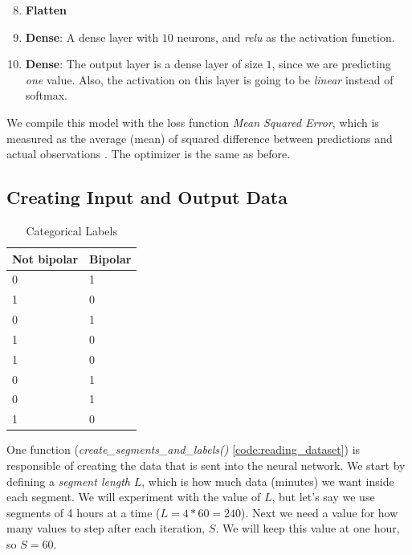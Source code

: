 \begin{enumerate}
      \setcounter{enumi}{7}
      \item \textbf{Flatten}
      \item \textbf{Dense}: A dense layer with $10$ neurons, and \textit{relu} as the activation function.
      \item \textbf{Dense}: The output layer is a dense layer of size $1$, since we are predicting \textit{one} value. 
            Also, the activation on this layer is going to be \textit{linear} instead of softmax.
\end{enumerate}

We compile this model with the loss function \textit{Mean Squared Error}, which is measured as the average (mean) 
of squared difference between predictions and actual observations \cite{loss_functions}. The optimizer is the same as before.

\subsection{Creating Input and Output Data}
\begin{table}
  \begin{center}
    \begin{tabular}{| l | l |}
      \hline
      \textbf{Not bipolar} & \textbf{Bipolar}  \\ \hline
      0                    &  1                \\ \hline
      1                    &  0                \\ \hline
      0                    &  1                \\ \hline
      1                    &  0                \\ \hline
      1                    &  0                \\ \hline
      0                    &  1                \\ \hline
      0                    &  1                \\ \hline
      1                    &  0                \\ \hline
    \end{tabular}
    \caption{Categorical Labels}
    \label{table:categorical_labels}
  \end{center}
\end{table}

One function (\textit{create\_segments\_and\_labels()} \ref{code:reading_dataset}) is responsible of creating the data that is sent into the neural network. 
We start by defining a \textit{segment length} $L$, which is how much data (minutes) we want inside each segment. We will experiment with the value of $L$, 
but let's say we use segments of 4 hours at a time ($L=4*60=240$). Next we need a value for how many values to step after each iteration, $S$. 
We will keep this value at one hour, so $S=60$. 

